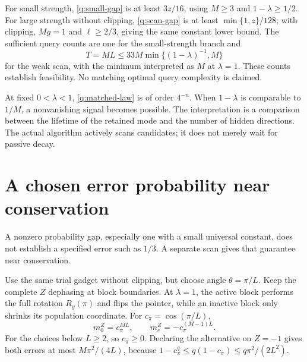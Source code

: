 \documentclass[11pt,a4paper]{article}
\numberwithin{equation}{section}
\theoremstyle{definition}
\theoremstyle{remark}
\begin{document}
For small strength, \eqref{q:small-gap} is at least $3z/16$, using
$M\geq3$ and $1-\lambda\geq1/2$. For large strength without clipping,
\eqref{q:scan-gap} is at least $\min\{1,z\}/128$; with clipping,
$Mg=1$ and $\ell\geq2/3$, giving the same constant lower bound.
The sufficient query counts are one for the small-strength branch and
\begin{equation}
 T=ML\leq33M\min\{(1-\lambda)^{-1},M\}
 \label{q:weak-query-cost}
\end{equation}
for the weak scan, with the minimum interpreted as $M$ at $\lambda=1$.
These counts establish feasibility. No matching optimal query complexity is
claimed.

At fixed $0<\lambda<1$, \eqref{q:matched-law} is of order $4^{-n}$. When
$1-\lambda$ is comparable to $1/M$, a nonvanishing signal becomes possible.
The interpretation is a comparison between the lifetime of the retained mode
and the number of hidden directions. The actual algorithm actively scans
candidates; it does not merely wait for passive decay.

\section{A chosen error probability near conservation}

A nonzero probability gap, especially one with a small universal constant,
does not establish a specified error such as $1/3$. A separate scan gives that
guarantee near conservation.

Use the same trial gadget without clipping, but choose angle $\theta=\pi/L$.
Keep the complete $Z$ dephasing at block boundaries. At $\lambda=1$, the active
block performs the full rotation $R_y(\pi)$ and flips the pointer, while an
inactive block only shrinks its population coordinate. For
$c_\pi=\cos(\pi/L)$,
\[
 m_0^Z=c_\pi^{ML},\qquad m_e^Z=-c_\pi^{(M-1)L}.
\]
For the choices below $L\geq2$, so $c_\pi\geq0$. Declaring the alternative on
$Z=-1$ gives both errors at most $M\pi^2/(4L)$, because
$1-c_\pi^q\leq q(1-c_\pi)\leq q\pi^2/(2L^2)$.
\end{document}
